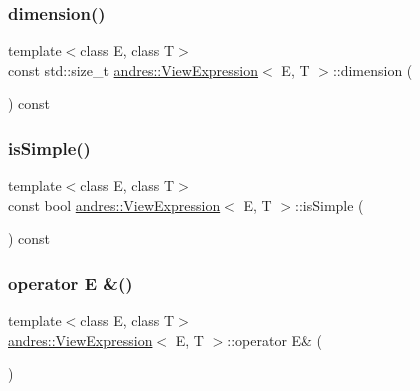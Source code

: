 \subsubsection{\texorpdfstring{dimension()}{dimension()}}
{\footnotesize\ttfamily template$<$class E, class T$>$ \\
const std\+::size\+\_\+t \hyperlink{classandres_1_1ViewExpression}{andres\+::\+View\+Expression}$<$ E, T $>$\+::dimension (\begin{DoxyParamCaption}{ }\end{DoxyParamCaption}) const\hspace{0.3cm}{\ttfamily [inline]}}

\mbox{\label{classandres_1_1ViewExpression_ad9d83c265ad470fca0403cab659dbf0a}} 
\subsubsection{\texorpdfstring{is\+Simple()}{isSimple()}}
{\footnotesize\ttfamily template$<$class E, class T$>$ \\
const bool \hyperlink{classandres_1_1ViewExpression}{andres\+::\+View\+Expression}$<$ E, T $>$\+::is\+Simple (\begin{DoxyParamCaption}{ }\end{DoxyParamCaption}) const\hspace{0.3cm}{\ttfamily [inline]}}

\mbox{\label{classandres_1_1ViewExpression_ac86ef8d95feb437c9b2707b6e7917f9e}} 
\subsubsection{\texorpdfstring{operator E \&()}{operator E \&()}}
{\footnotesize\ttfamily template$<$class E, class T$>$ \\
\hyperlink{classandres_1_1ViewExpression}{andres\+::\+View\+Expression}$<$ E, T $>$\+::operator E\& (\begin{DoxyParamCaption}{ }\end{DoxyParamCaption})\hspace{0.3cm}{\ttfamily [inline]}}

